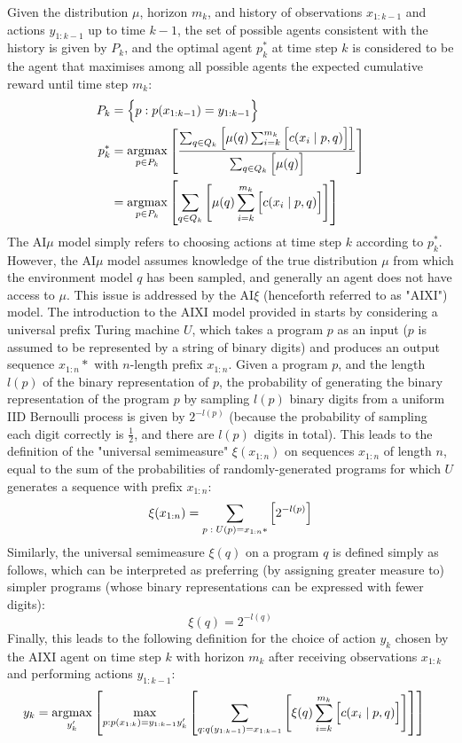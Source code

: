 Given the distribution $\mu$, horizon $m_k$, and history of observations $x_{1:k-1}$ and actions $y_{1:k-1}$ up to time $k-1$, the set of possible agents consistent with the history is given by $P_k$, and the optimal agent $p^*_k$ at time step $k$ is considered to be the agent that maximises among all possible agents the expected cumulative reward until time step $m_k$:
\begin{align*}
    P_k &= \Bigl\{ p:p(x_{1:k-1}) = y_{1:k-1} \Bigr\} \\
    p^*_k &= \underset{p\in P_k}{\operatorname{argmax}}\left[ \frac{\sum_{q\in Q_k}{\left[ \mu(q) \sum_{i=k}^{m_k}{\Bigl[ c(x_i \mid p, q) \Bigr]} \right]}}{\sum_{q\in Q_k}{\Bigl[ \mu(q) \Bigr]}} \right] \\
    &= \underset{p\in P_k}{\operatorname{argmax}}\left[ \sum_{q\in Q_k}{\left[ \mu(q) \sum_{i=k}^{m_k}{\Bigl[ c(x_i \mid p, q) \Bigr]} \right]} \right]
\end{align*}
The AI$\mu$ model simply refers to choosing actions at time step $k$ according to $p^*_k$. However, the AI$\mu$ model assumes knowledge of the true distribution $\mu$ from which the environment model $q$ has been sampled, and generally an agent does not have access to $\mu$. This issue is addressed by the AI$\xi$ (henceforth referred to as "AIXI") model. The introduction to the AIXI model provided in \cite{hutter2000theory} starts by considering a universal prefix Turing machine $U$, which takes a program $p$ as an input ($p$ is assumed to be represented by a string of binary digits) and produces an output sequence $x_{1:n}*$ with $n$-length prefix $x_{1:n}$. Given a program $p$, and the length $l(p)$ of the binary representation of $p$, the probability of generating the binary representation of the program $p$ by sampling $l(p)$ binary digits from a uniform IID Bernoulli process is given by $2^{-l(p)}$ (because the probability of sampling each digit correctly is $\frac{1}{2}$, and there are $l(p)$ digits in total). This leads to the definition of the "universal semimeasure" $\xi(x_{1:n})$ on sequences $x_{1:n}$ of length $n$, equal to the sum of the probabilities of randomly-generated programs for which $U$ generates a sequence with prefix $x_{1:n}$:
\begin{equation*}
    \xi(x_{1:n}) = \sum_{p\;:\;U(p)=x_{1:n}*}{\Bigl[ 2^{-l(p)} \Bigr]}
\end{equation*}
Similarly, the universal semimeasure $\xi(q)$ on a program $q$ is defined simply as follows, which can be interpreted as preferring (by assigning greater measure to) simpler programs (whose binary representations can be expressed with fewer digits):
\begin{equation*}
    \xi(q) = 2^{-l(q)}
\end{equation*}
Finally, this leads to the following definition for the choice of action $y_k$ chosen by the AIXI agent on time step $k$ with horizon $m_k$ after receiving observations $x_{1:k}$ and performing actions $y_{1:k-1}$:
\begin{align*}
    y_k &= \underset{y_k'}{\operatorname{argmax}}\left[ \max_{p:p(x_{1:k})=y_{1:k-1}y_k'}\left[ \sum_{q:q(y_{1:k-1})=x_{1:k-1}}{\left[ \xi(q) \sum_{i=k}^{m_k}{\Bigl[ c(x_i \mid p, q) \Bigr]} \right]} \right] \right]
\end{align*}
